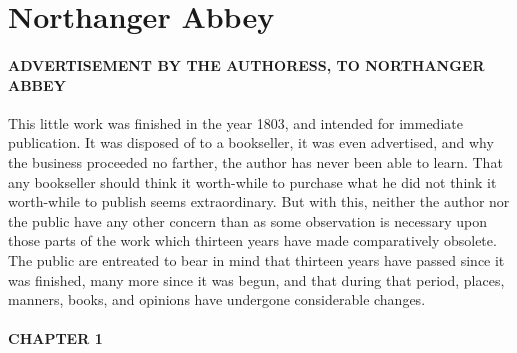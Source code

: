 \part{Northanger Abbey}

\subsection[advertisement-by-the-authoress-to-northanger-abbey]{\useURL[url1][][][]\from[url1] ADVERTISEMENT BY THE AUTHORESS, TO NORTHANGER ABBEY}

This little work was finished in the year 1803, and intended for immediate publication. It was disposed of to a bookseller, it was even advertised, and why the business proceeded no farther, the author has never been able to learn. That any bookseller should think it worth-while to purchase what he did not think it worth-while to publish seems extraordinary. But with this, neither the author nor the public have any other concern than as some observation is necessary upon those parts of the work which thirteen years have made comparatively obsolete. The public are entreated to bear in mind that thirteen years have passed since it was finished, many more since it was begun, and that during that period, places, manners, books, and opinions have undergone considerable changes.

\subsection[chapter-1]{\useURL[url2][][][]\from[url2]CHAPTER 1}

